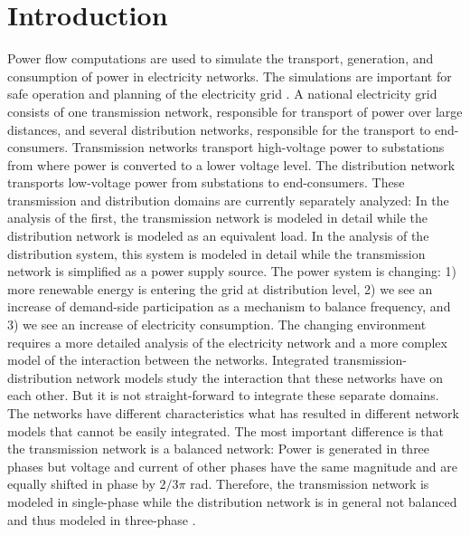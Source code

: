 \documentclass[10pt,journal]{article}
\begin{document}
\section{Introduction}
Power flow computations are used to simulate the transport, generation, and consumption of power in electricity networks. The simulations are important for safe operation and planning of the electricity grid . A national electricity grid consists of one transmission network, responsible for transport of power over large distances, and several distribution networks, responsible for the transport to end-consumers. Transmission networks transport high-voltage power to substations from where power is converted to a lower voltage level. The distribution network transports low-voltage power from substations to end-consumers. These transmission and distribution domains are currently separately analyzed: In the analysis of the first, the transmission network is modeled in detail while the distribution network is modeled as an equivalent load. In the analysis of the distribution system, this system is modeled in detail while the transmission network is simplified as a power supply source.  \newline\newline
The power system is changing: 1) more renewable energy is entering the grid at distribution level, 2) we see an increase of demand-side participation as a mechanism to balance frequency, and 3) we see an increase of electricity consumption. The changing environment requires a more detailed analysis of the electricity network and a more complex model of the interaction between the networks. Integrated transmission-distribution network models study the interaction that these networks have on each other. But it is not straight-forward to integrate these separate domains. The networks have different characteristics what has resulted in different network models that cannot be easily integrated. The most important difference is that the transmission network is a balanced network: Power is generated in three phases but voltage and current of other phases have the same magnitude and are equally shifted in phase by $2/3\pi$ rad. Therefore, the transmission network is modeled in single-phase while the distribution network is in general not balanced and thus modeled in three-phase . 
\end{document}
